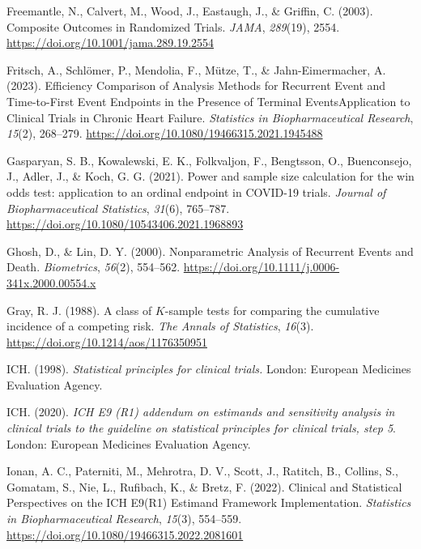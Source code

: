\documentclass[
  letterpaper,
  DIV=11,
  numbers=noendperiod]{scrreprt}
\newlength{\cslhangindent}
\newlength{\cslentryspacingunit} %
\newenvironment{CSLReferences}[2] %
 {%
  \setlength{\parindent}{0pt}
  \ifodd #1
  \let\oldpar\par
  \def\par{\hangindent=\cslhangindent\oldpar}
  \fi
  \setlength{\parskip}{#2\cslentryspacingunit}
 }%
 {}
\begin{document}
\begin{CSLReferences}{1}{0}
\leavevmode{}%
Freemantle, N., Calvert, M., Wood, J., Eastaugh, J., \& Griffin, C.
(2003). Composite Outcomes in Randomized Trials. \emph{JAMA},
\emph{289}(19), 2554. \url{https://doi.org/10.1001/jama.289.19.2554}

\leavevmode{}%
Fritsch, A., Schlömer, P., Mendolia, F., Mütze, T., \& Jahn-Eimermacher,
A. (2023). Efficiency Comparison of Analysis Methods for Recurrent Event
and Time-to-First Event Endpoints in the Presence of Terminal
Events{\textemdash}Application to Clinical Trials in Chronic Heart
Failure. \emph{Statistics in Biopharmaceutical Research}, \emph{15}(2),
268--279. \url{https://doi.org/10.1080/19466315.2021.1945488}

\leavevmode{}%
Gasparyan, S. B., Kowalewski, E. K., Folkvaljon, F., Bengtsson, O.,
Buenconsejo, J., Adler, J., \& Koch, G. G. (2021). Power and sample size
calculation for the win odds test: application to an ordinal endpoint in
COVID-19 trials. \emph{Journal of Biopharmaceutical Statistics},
\emph{31}(6), 765--787.
\url{https://doi.org/10.1080/10543406.2021.1968893}

\leavevmode{}%
Ghosh, D., \& Lin, D. Y. (2000). Nonparametric Analysis of Recurrent
Events and Death. \emph{Biometrics}, \emph{56}(2), 554--562.
\url{https://doi.org/10.1111/j.0006-341x.2000.00554.x}

\leavevmode{}%
Gray, R. J. (1988). A class of \(K\)-sample tests for comparing the
cumulative incidence of a competing risk. \emph{The Annals of
Statistics}, \emph{16}(3). \url{https://doi.org/10.1214/aos/1176350951}

\leavevmode{}%
ICH. (1998). \emph{Statistical principles for clinical trials.} London:
European Medicines Evaluation Agency.

\leavevmode{}%
ICH. (2020). \emph{ICH E9 (R1) addendum on estimands and sensitivity
analysis in clinical trials to the guideline on statistical principles
for clinical trials, step 5}. London: European Medicines Evaluation
Agency.

\leavevmode{}%
Ionan, A. C., Paterniti, M., Mehrotra, D. V., Scott, J., Ratitch, B.,
Collins, S., Gomatam, S., Nie, L., Rufibach, K., \& Bretz, F. (2022).
Clinical and Statistical Perspectives on the ICH E9(R1) Estimand
Framework Implementation. \emph{Statistics in Biopharmaceutical
Research}, \emph{15}(3), 554--559.
\url{https://doi.org/10.1080/19466315.2022.2081601}


\end{CSLReferences}
\end{document}
